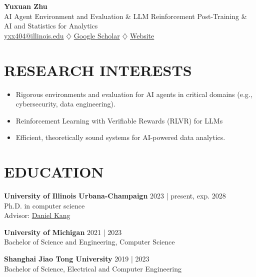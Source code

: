 \documentclass[a4paper,9pt]{extarticle}
\begin{document}
\pagestyle{fancy}
\renewcommand{\headrulewidth}{0pt}
\fancyhead{}
\fancyhead[R]{\textit{\today}}
\thispagestyle{empty} %
\newcommand{\pubitem}[4]{#1. ``#2'' \textit{#3} #4}
\begin{flushleft}
\textbf{\LARGE Yuxuan Zhu}\\[2pt] %
AI Agent Environment and Evaluation \& LLM Reinforcement Post-Training \& AI and Statistics for Analytics
\\ \href{mailto:yxx404@illinois.edu}{yxx404@illinois.edu} $\diamondsuit$ \href{https://scholar.google.com/citations?user=VxMpvw0AAAAJ&hl=en&authuser=1}{Google Scholar} $\diamondsuit$ \href{https://yuxuan18.github.io}{Website}
\end{flushleft}
 
\section*{RESEARCH INTERESTS}
\noindent
\begin{itemize}
    \item Rigorous environments and evaluation for AI agents in critical domains (e.g., cybersecurity, data engineering).
    \item Reinforcement Learning with Verifiable Rewards (RLVR) for LLMs
    \item Efficient, theoretically sound systems for AI-powered data analytics.
\end{itemize}
\section*{EDUCATION}
\noindent
\textbf{University of Illinois Urbana-Champaign} \hfill 2023 | present, exp. 2028\\ %
Ph.D. in computer science \\ %
Advisor: \href{https://ddkang.github.io/}{Daniel Kang} %
\vspace{0.1in}

\noindent
\textbf{University of Michigan} \hfill 2021 | 2023\\ %
Bachelor of Science and Engineering, Computer Science %
\vspace{0.1in}

\noindent
\textbf{Shanghai Jiao Tong University} \hfill 2019 | 2023\\
Bachelor of Science, Electrical and Computer Engineering%
\end{document}
